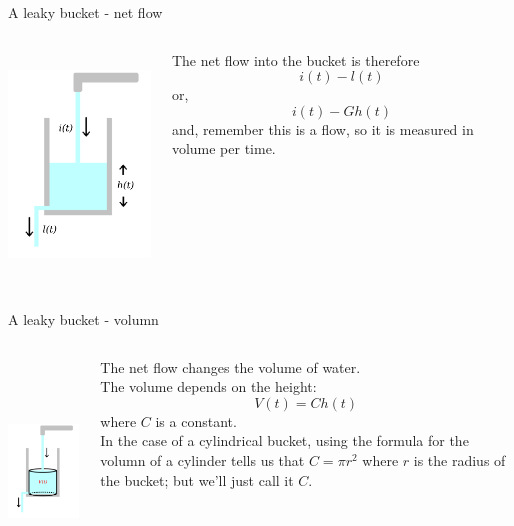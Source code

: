 \documentclass{beamer}
\newcommand{\crish}{\color{reddish}}
\newcommand{\cbla}{\color{black}}
\begin{document}
\begin{frame}{A leaky bucket - net flow}
\begin{columns}
\begin{column}{0.5\textwidth}
  \begin{center}
     \includegraphics[height=6cm]{glass_notation.png}      
     \end{center}
\end{column}
\begin{column}{0.5\textwidth}
  The net flow into the bucket is therefore\crish
  $$i(t)- l(t)$$
  \cbla{}or,\crish{} 
  $$i(t)-Gh(t)$$
  \cbla{}and, remember this is a flow, so it is measured in volume per time.

\end{column}
\end{columns}
\end{frame}


\begin{frame}{A leaky bucket - volumn}
\begin{columns}
\begin{column}{0.5\textwidth}
  \begin{center}
     \includegraphics[height=6cm]{glass_volume_notation.png}      
     \end{center}
\end{column}
\begin{column}{0.5\textwidth}
  The net flow changes the volume of water.\\[0.5cm]
  
The volume depends on the height:
  \crish
  $$V(t)=Ch(t)$$ \cbla{}where \crish$C$\cbla{} is a constant.\\[0.5cm]
  In the case of a
  cylindrical bucket, using the formula for the volumn of a cylinder
  tells us that \crish$C=\pi r^2$\cbla{} where \crish$r$\cbla{} is the
  radius of the bucket; but we'll just call it \crish$C$\cbla.
\end{column}
\end{columns}
\end{frame}
\end{document}
